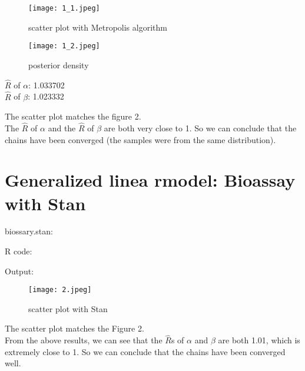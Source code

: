 \documentclass[article,11pt]{article}
\begin{document}
 \begin{figure}[H]
	\centering
	\captionsetup{justification=centering}
	\texttt{[image: 1\_1.jpeg]}
	\caption{scatter plot with Metropolis algorithm}
\end{figure}
 \begin{figure}[H]
	\centering
	\captionsetup{justification=centering}
	\texttt{[image: 1\_2.jpeg]}
	\caption{posterior density}
\end{figure}
\begin{center}
	$\hat{R}$ of $\alpha$: 1.033702 \\
	$\hat{R}$ of $\beta$: 1.023332
\end{center}
The scatter plot matches the figure 2.\\
The $\hat{R}$ of $\alpha$ and the $\hat{R}$ of $\beta$ are both very close to 1. So we can conclude that the chains have been converged (the samples were from the same distribution).

\section{ Generalized linea rmodel: Bioassay with Stan}
{\large biossary.stan:}

R code:

Output:

\begin{figure}[H]
	\centering
	\captionsetup{justification=centering}
	\texttt{[image: 2.jpeg]}
	\caption{scatter plot with Stan}
\end{figure}
The scatter plot matches the Figure 2.\\
From the above results, we can see that the  $\hat{R}$s of $\alpha$ and $\beta$ are both 1.01, which is extremely close to 1. So we can conclude that the chains have been converged well.
\end{document}
